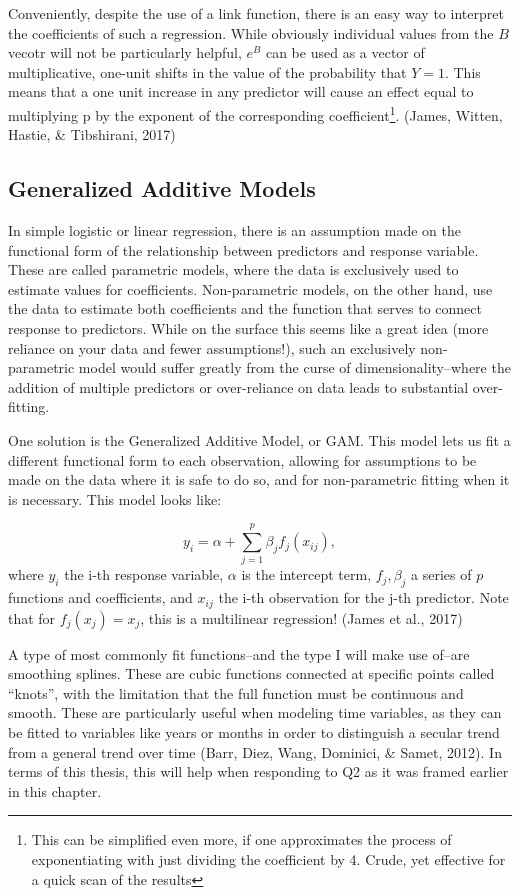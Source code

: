 \documentclass[12pt,twoside]{reedthesis}
\begin{document}
  Conveniently, despite the use of a link function, there is an easy way
  to interpret the coefficients of such a regression. While obviously
  individual values from the \(B\) vecotr will not be particularly
  helpful, \(e^B\) can be used as a vector of multiplicative, one-unit
  shifts in the value of the probability that \(Y = 1\). This means that a
  one unit increase in any predictor will cause an effect equal to
  multiplying p by the exponent of the corresponding coefficient\footnote{This
    can be simplified even more, if one approximates the process of
    exponentiating with just dividing the coefficient by 4. Crude, yet
    effective for a quick scan of the results}. (James, Witten, Hastie, \&
  Tibshirani, 2017)
  
  \subsection{Generalized Additive
  Models}\label{generalized-additive-models}
  
  In simple logistic or linear regression, there is an assumption made on
  the functional form of the relationship between predictors and response
  variable. These are called parametric models, where the data is
  exclusively used to estimate values for coefficients. Non-parametric
  models, on the other hand, use the data to estimate both coefficients
  and the function that serves to connect response to predictors. While on
  the surface this seems like a great idea (more reliance on your data and
  fewer assumptions!), such an exclusively non-parametric model would
  suffer greatly from the curse of dimensionality--where the addition of
  multiple predictors or over-reliance on data leads to substantial
  over-fitting.
  
  One solution is the Generalized Additive Model, or GAM. This model lets
  us fit a different functional form to each observation, allowing for
  assumptions to be made on the data where it is safe to do so, and for
  non-parametric fitting when it is necessary. This model looks like:
  
  \[y_i = \alpha + \sum_{j = 1}^p \beta_j f_j(x_{ij}),\] where \(y_i\) the
  i-th response variable, \(\alpha\) is the intercept term,
  \(f_j, \beta_j\) a series of \(p\) functions and coefficients, and
  \(x_{ij}\) the i-th observation for the j-th predictor. Note that for
  \(f_j(x_j) = x_j\), this is a multilinear regression! (James et al.,
  2017)
  
  A type of most commonly fit functions--and the type I will make use
  of--are smoothing splines. These are cubic functions connected at
  specific points called ``knots'', with the limitation that the full
  function must be continuous and smooth. These are particularly useful
  when modeling time variables, as they can be fitted to variables like
  years or months in order to distinguish a secular trend from a general
  trend over time (Barr, Diez, Wang, Dominici, \& Samet, 2012). In terms
  of this thesis, this will help when responding to Q2 as it was framed
  earlier in this chapter.
  
\end{document}
